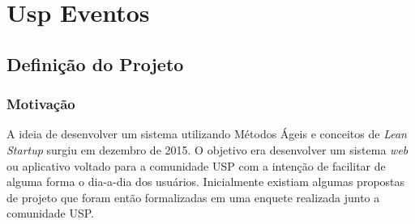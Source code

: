 \chapter{Usp Eventos}
\label{cap:uspeventos}
\section{Definição do Projeto}
\subsection{Motivação}
        \par A ideia de desenvolver um sistema utilizando Métodos Ágeis e conceitos de \emph{Lean Startup} surgiu em dezembro de 2015. O objetivo era desenvolver um sistema \emph{web} ou aplicativo voltado para a comunidade USP com a intenção de facilitar de alguma forma o dia-a-dia dos usuários. Inicialmente existiam algumas propostas de projeto que foram então formalizadas em uma enquete realizada junto a comunidade USP.
